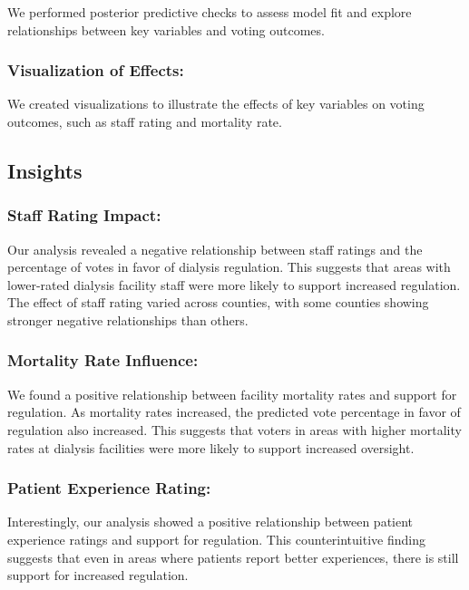 \documentclass[
  11pt,
  letterpaper,
  DIV=11,
  numbers=noendperiod]{scrartcl}
\begin{document}
We performed posterior predictive checks to assess model fit and explore
relationships between key variables and voting outcomes.

\subsubsection{Visualization of
Effects:}\label{visualization-of-effects}

We created visualizations to illustrate the effects of key variables on
voting outcomes, such as staff rating and mortality rate.

\subsection{Insights}\label{insights}

\subsubsection{Staff Rating Impact:}\label{staff-rating-impact}

Our analysis revealed a negative relationship between staff ratings and
the percentage of votes in favor of dialysis regulation. This suggests
that areas with lower-rated dialysis facility staff were more likely to
support increased regulation. The effect of staff rating varied across
counties, with some counties showing stronger negative relationships
than others.

\subsubsection{Mortality Rate
Influence:}\label{mortality-rate-influence}

We found a positive relationship between facility mortality rates and
support for regulation. As mortality rates increased, the predicted vote
percentage in favor of regulation also increased. This suggests that
voters in areas with higher mortality rates at dialysis facilities were
more likely to support increased oversight.

\subsubsection{Patient Experience
Rating:}\label{patient-experience-rating}

Interestingly, our analysis showed a positive relationship between
patient experience ratings and support for regulation. This
counterintuitive finding suggests that even in areas where patients
report better experiences, there is still support for increased
regulation.
\end{document}
